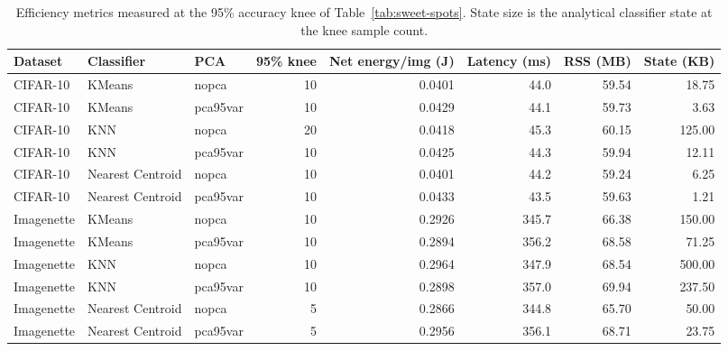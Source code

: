 \documentclass[sigconf,review]{acmart}
\begin{document}
\begin{table}[t]
  \caption{Efficiency metrics measured at the 95\% accuracy knee of Table~\ref{tab:sweet-spots}. State size is the analytical classifier state at the knee sample count.}
  \label{tab:sweet-spots-eff}
  \centering
  \footnotesize
  \begin{tabular}{@{}lllrrrrr@{}}
    \toprule
    Dataset & Classifier & PCA & 95\% knee & Net energy/img (J) & Latency (ms) & RSS (MB) & State (KB) \\
    \midrule
    CIFAR-10 & KMeans & nopca & 10 & 0.0401 & 44.0 & 59.54 & 18.75 \\
    CIFAR-10 & KMeans & pca95var & 10 & 0.0429 & 44.1 & 59.73 & 3.63 \\
    CIFAR-10 & KNN & nopca & 20 & 0.0418 & 45.3 & 60.15 & 125.00 \\
    CIFAR-10 & KNN & pca95var & 10 & 0.0425 & 44.3 & 59.94 & 12.11 \\
    CIFAR-10 & Nearest Centroid & nopca & 10 & 0.0401 & 44.2 & 59.24 & 6.25 \\
    CIFAR-10 & Nearest Centroid & pca95var & 10 & 0.0433 & 43.5 & 59.63 & 1.21 \\
    Imagenette & KMeans & nopca & 10 & 0.2926 & 345.7 & 66.38 & 150.00 \\
    Imagenette & KMeans & pca95var & 10 & 0.2894 & 356.2 & 68.58 & 71.25 \\
    Imagenette & KNN & nopca & 10 & 0.2964 & 347.9 & 68.54 & 500.00 \\
    Imagenette & KNN & pca95var & 10 & 0.2898 & 357.0 & 69.94 & 237.50 \\
    Imagenette & Nearest Centroid & nopca & 5 & 0.2866 & 344.8 & 65.70 & 50.00 \\
    Imagenette & Nearest Centroid & pca95var & 5 & 0.2956 & 356.1 & 68.71 & 23.75 \\
    \bottomrule
  \end{tabular}
\end{table}
\end{document}
